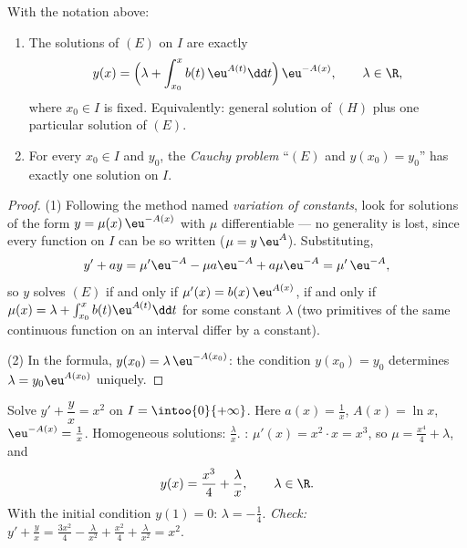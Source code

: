 \begin{theorem}\label{thm:b1:diffeq:voc}
With the notation above:
\begin{enumerate}
  \item The solutions of $(E)$ on $I$ are exactly
        \[
        y(x) = \Bigl(\lambda + \int_{x_0}^{x} b(t)\, \eu^{A(t)} \dd t
        \Bigr)\, \eu^{-A(x)},
        \qquad \lambda \in \R,
        \]
        where $x_0 \in I$ is fixed. Equivalently: general solution of
        $(H)$ plus one particular solution of $(E)$.
  \item For every $x_0 \in I$ and $y_0$, the \emph{Cauchy
        problem} ``$(E)$ and $y(x_0) = y_0$''
        has exactly one solution on $I$.
\end{enumerate}
\end{theorem}

\begin{proof}
(1) Following the method named \emph{variation of
constants}, look for solutions of the
form $y = \mu(x)\, \eu^{-A(x)}$ with $\mu$ differentiable --- no
generality is lost, since every function on $I$ can be so written
($\mu = y\,\eu^{A}$). Substituting,
\[
y' + ay = \mu' \eu^{-A} - \mu a \eu^{-A} + a\mu\eu^{-A}
= \mu'\, \eu^{-A},
\]
so $y$ solves $(E)$ if and only if $\mu'(x) = b(x)\,\eu^{A(x)}$, if
and only if $\mu(x) = \lambda + \int_{x_0}^x b(t)\eu^{A(t)}\dd t$ for
some constant $\lambda$ (two primitives of the same continuous
function on an interval differ by a constant).

(2) In the formula, $y(x_0) = \lambda\,\eu^{-A(x_0)}$: the condition
$y(x_0) = y_0$ determines $\lambda = y_0 \eu^{A(x_0)}$ uniquely.
\end{proof}

\begin{example}\label{ex:b1:diffeq:order1}
Solve $y' + \dfrac{y}{x} = x^2$ on $I = \intoo{0}{+\infty}$. Here
$a(x) = \frac 1x$, $A(x) = \ln x$, $\eu^{-A(x)} = \frac 1x$.
Homogeneous solutions: $\frac{\lambda}{x}$. :
$\mu'(x) = x^2 \cdot x = x^3$, so $\mu = \frac{x^4}{4} + \lambda$, and
\[
y(x) = \frac{x^3}{4} + \frac{\lambda}{x}, \qquad \lambda \in \R .
\]
With the initial condition $y(1) = 0$: $\lambda = -\frac14$.
\emph{Check:} $y' + \frac yx = \frac{3x^2}{4} - \frac{\lambda}{x^2} +
\frac{x^2}{4} + \frac{\lambda}{x^2} = x^2$.
\end{example}


